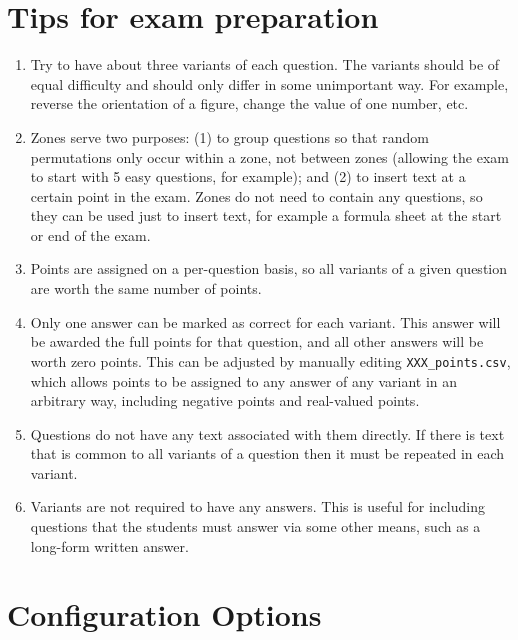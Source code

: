 \documentclass{article}
\begin{document}
\section{Tips for exam preparation}

\begin{enumerate}
\item Try to have about three variants of each question. The variants
  should be of equal difficulty and should only differ in some
  unimportant way. For example, reverse the orientation of a figure,
  change the value of one number, etc.
\item Zones serve two purposes: (1) to group questions so that random
  permutations only occur within a zone, not between zones (allowing
  the exam to start with 5 easy questions, for example); and (2) to
  insert text at a certain point in the exam. Zones do not need to
  contain any questions, so they can be used just to insert text, for
  example a formula sheet at the start or end of the exam.
\item Points are assigned on a per-question basis, so all variants of
  a given question are worth the same number of points.
\item Only one answer can be marked as correct for each variant. This
  answer will be awarded the full points for that question, and all
  other answers will be worth zero points. This can be adjusted by
  manually editing \texttt{XXX_points.csv}, which allows points to be
  assigned to any answer of any variant in an arbitrary way, including
  negative points and real-valued points.
\item Questions do not have any text associated with them directly. If
  there is text that is common to all variants of a question then it
  must be repeated in each variant.
\item Variants are not required to have any answers. This is useful
  for including questions that the students must answer via some other
  means, such as a long-form written answer.
\end{enumerate}

\section{Configuration Options}
\end{document}
